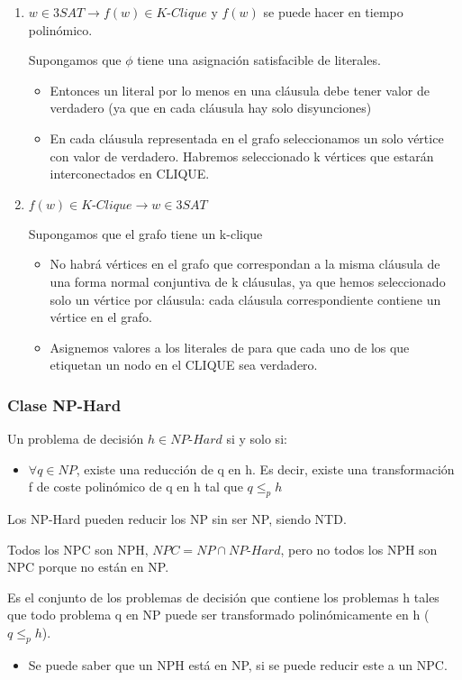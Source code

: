\begin{enumerate}
  \item $w\in \textit{3SAT} \rightarrow f(w)\in \textit{K-Clique}$ y $f(w)$ se puede hacer en tiempo polinómico.
  
  Supongamos que $\phi$ tiene una asignación satisfacible de literales.
  \begin{itemize}
    \item Entonces un literal por lo menos en una cláusula debe tener valor de verdadero (ya que en cada cláusula hay solo disyunciones)
    \item En cada cláusula representada en el grafo seleccionamos un solo vértice con valor de verdadero. Habremos seleccionado k vértices que estarán interconectados en CLIQUE.
  \end{itemize}
  \item $f(w)\in \textit{K-Clique} \rightarrow w \in \textit{3SAT}$
  
  Supongamos que el grafo tiene un k-clique
  \begin{itemize}
    \item No habrá vértices en el grafo que correspondan a la misma cláusula de una forma normal conjuntiva de k cláusulas, ya que hemos seleccionado solo un vértice por cláusula: cada cláusula correspondiente contiene un vértice en el grafo.
    \item Asignemos valores a los literales de para que cada uno de los que etiquetan un nodo en el CLIQUE sea verdadero.
  \end{itemize}
\end{enumerate}
\pagebreak

\subsubsection{Clase NP-Hard}
Un problema de decisión $h \in \textit{NP-Hard}$ si y solo si:
\begin{itemize}
  \item $\forall q \in NP$, existe una reducción de q en h. Es decir, existe una transformación f de coste polinómico de q en h tal que $q \leq_p h$
\end{itemize}

Los NP-Hard pueden reducir los NP sin ser NP, siendo NTD.

Todos los NPC son NPH, $\textit{NPC}=\textit{NP} \cap \textit{NP-Hard}$, pero no todos los NPH son NPC porque no están en NP.

Es el conjunto de los problemas de decisión que contiene los problemas h tales que todo problema q en NP puede ser transformado polinómicamente en h ($q \leq_p h$).
\begin{itemize}
  \item Se puede saber que un NPH está en NP, si se puede reducir este a un NPC.
\end{itemize}

